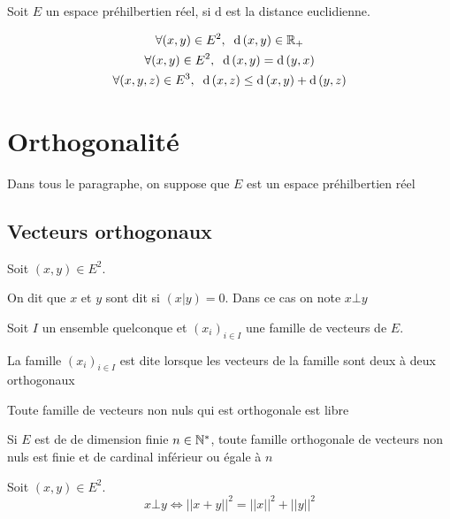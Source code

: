 \begin{prp}
Soit $E$ un espace préhilbertien réel, si $\mathrm{d}$ est la distance
euclidienne.

\begin{gather*}
    \forall (x, y) \in E^2, \;\; \mathrm{d}\,(x, y) \in \mathbb{R}_+ \\
    \forall (x, y) \in E^2, \;\; \mathrm{d}\,(x, y) = \mathrm{d}\,(y, x) \\
    \forall (x, y, z) \in E^3, \;\; \mathrm{d}\,(x, z) \leq
        \mathrm{d}\,(x, y) + \mathrm{d}\,(y, z)
\end{gather*}
\end{prp}

\section{Orthogonalité}

Dans tous le paragraphe, on suppose que $E$ est un espace préhilbertien
réel

\subsection{Vecteurs orthogonaux}

\begin{dfn}
Soit $(x, y) \in E^2$.

On dit que $x$ et $y$ sont dit  si $(x | y) = 0$.
Dans ce cas on note $x \bot y$
\end{dfn}

\begin{dfn}
Soit $I$ un ensemble quelconque et $(x_i)_{i \in I}$ une famille de
vecteurs de $E$.

La famille $(x_i)_{i \in I}$ est dite  lorsque les
vecteurs de la famille sont deux à deux orthogonaux
\end{dfn}

\begin{prp}
Toute famille de vecteurs non nuls qui est orthogonale est libre
\end{prp}

\begin{prp}
Si $E$ est de de dimension finie $n \in \mathbb{N}^*$, toute famille orthogonale
de vecteurs non nuls est finie et de cardinal inférieur ou égale à $n$
\end{prp}

\begin{thm}[de Pythagore]
Soit $(x, y) \in E^2$.
\[
    x \bot y \iff || x + y ||^2 = ||x||^2 + ||y||^2
\]
\end{thm}

